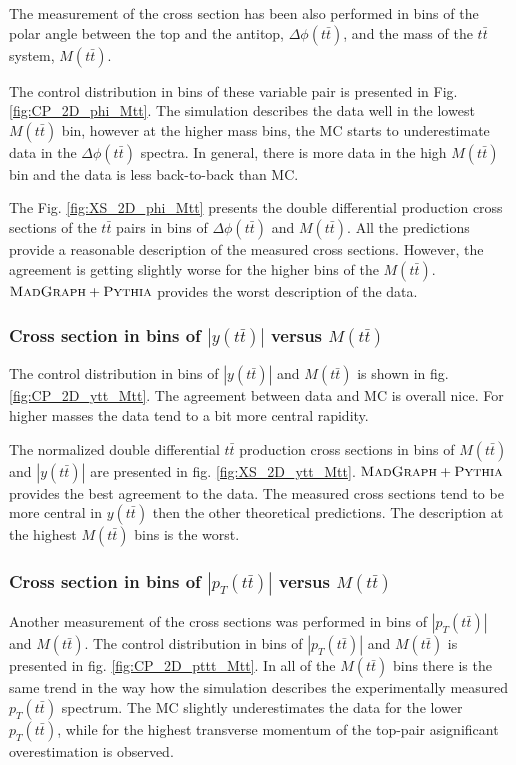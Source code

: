 The measurement of the cross section has been also performed in bins of the polar angle between the top and the antitop, $\Delta\phi(t\bar{t})$, and the mass
of the $t\bar{t}$ system, $M(t\bar{t})$.

The control distribution in bins of these variable pair is presented in Fig. \ref{fig:CP_2D_phi_Mtt}. The simulation describes the data well in the lowest $M(t\bar{t})$ bin, 
however at the higher mass bins, the MC starts to underestimate data in the $\Delta\phi(t\bar{t})$ spectra. In general, there is more data in the high $M(t\bar{t})$ bin and 
the data is less back-to-back than MC.

The Fig. \ref{fig:XS_2D_phi_Mtt} presents the double differential production cross sections of the $t\bar{t}$ pairs in bins of $\Delta\phi(t\bar{t})$ and $M(t\bar{t})$.
All the predictions provide a reasonable description of the measured cross sections. However, the agreement is getting slightly worse for the higher bins of the $M(t\bar{t})$.
$\textsc{MadGraph}+\textsc{Pythia}$ provides the worst description of the data.

\subsubsection{Cross section in bins of $|y(t\bar{t})|$ versus $M(t\bar{t})$}

The control distribution in bins of $|y(t\bar{t})|$ and $M(t\bar{t})$ is shown in fig. \ref{fig:CP_2D_ytt_Mtt}. The agreement between data and MC is overall nice.
For higher masses the data tend to a bit more central rapidity.

The normalized double differential $t\bar{t}$ production cross sections in bins of $M(t\bar{t})$ and $|y(t\bar{t})|$ are presented in fig. \ref{fig:XS_2D_ytt_Mtt}.
$\textsc{MadGraph}+\textsc{Pythia}$ provides the best agreement to the data. 
The measured cross sections tend to be more central in $y(t\bar{t})$ then the other theoretical predictions. 
The description at the highest $M(t\bar{t})$ bins is the worst.

\subsubsection{Cross section in bins of $|p_{T}(t\bar{t})|$ versus $M(t\bar{t})$}

Another measurement of the cross sections was performed in bins of $|p_{T}(t\bar{t})|$ and $M(t\bar{t})$.
The control distribution in bins of $|p_{T}(t\bar{t})|$ and $M(t\bar{t})$ is presented in fig. \ref{fig:CP_2D_pttt_Mtt}. In all of the $M(t\bar{t})$
bins there is the same trend in the way how the simulation describes the experimentally measured $p_{T}(t\bar{t})$ spectrum. The MC slightly underestimates
the data for the lower $p_{T}(t\bar{t})$, while for the highest transverse momentum of the top-pair asignificant overestimation is observed.

